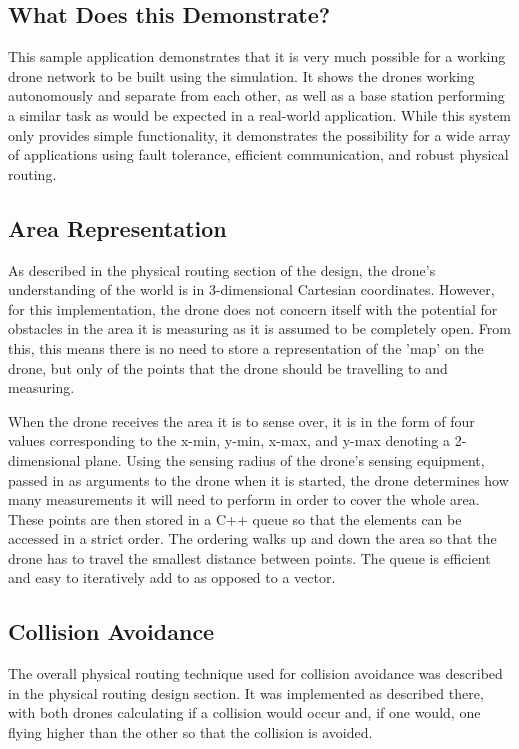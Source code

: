 \subsection{What Does this Demonstrate?}
This sample application demonstrates that it is very much possible for a working drone network to be built using the simulation. It shows the drones working autonomously and separate from each other, as well as a base station performing a similar task as would be expected in a real-world application. While this system only provides simple functionality, it demonstrates the possibility for a wide array of applications using fault tolerance, efficient communication, and robust physical routing.

\subsection{Area Representation}

As described in the physical routing section of the design, the drone's understanding of the world is in 3-dimensional Cartesian coordinates. However, for this implementation, the drone does not concern itself with the potential for obstacles in the area it is measuring as it is assumed to be completely open. From this, this means there is no need to store a representation of the 'map' on the drone, but only of the points that the drone should be travelling to and measuring.

When the drone receives the area it is to sense over, it is in the form of four values corresponding to the x-min, y-min, x-max, and y-max denoting a 2-dimensional plane. Using the sensing radius of the drone's sensing equipment, passed in as arguments to the drone when it is started, the drone determines how many measurements it will need to perform in order to cover the whole area. These points are then stored in a C++ queue so that the elements can be accessed in a strict order. The ordering walks up and down the area so that the drone has to travel the smallest distance between points. The queue is efficient and easy to iteratively add to as opposed to a vector.

\subsection{Collision Avoidance}

The overall physical routing technique used for collision avoidance was described in the physical routing design section. It was implemented as described there, with both drones calculating if a collision would occur and, if one would, one flying higher than the other so that the collision is avoided.

